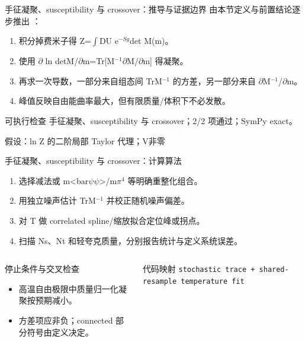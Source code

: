 \begin{frame}[t]{手征凝聚、susceptibility 与 crossover：推导与证据边界}
\footnotesize
{}\quad 由本节定义与前置结论逐步推出 ：
\begin{enumerate}
\item 积分掉费米子得 Z=\ensuremath{\int}DU e\ensuremath{^{-Sg}}det M(m)。
\item 使用 \ensuremath{\partial} ln detM/\allowbreak{}\ensuremath{\partial}m=Tr[M\ensuremath{^{-1}}\ensuremath{\partial}M/\allowbreak{}\ensuremath{\partial}m] 得凝聚。
\item 再求一次导数，一部分来自组态间 TrM\ensuremath{^{-1}} 的方差，另一部分来自 \ensuremath{\partial}M\ensuremath{^{-1}}/\allowbreak{}\ensuremath{\partial}m。
\item 峰值反映自由能曲率最大，但有限质量/\allowbreak{}体积下不必发散。
\end{enumerate}\begin{block}{可执行检查}
\quad 手征凝聚、susceptibility 与 crossover；2/2 项通过；SymPy exact。
\par\scriptsize 假设：ln Z 的二阶局部 Taylor 代理；V非零
\end{block}
\end{frame}

\begin{frame}[t]{手征凝聚、susceptibility 与 crossover：计算算法}
\footnotesize
{}\begin{enumerate}
\item 选择减法或 m<bar\ensuremath{\psi}\ensuremath{\psi}>/\allowbreak{}m\ensuremath{\pi}\ensuremath{^{4}} 等明确重整化组合。
\item 用独立噪声估计 TrM\ensuremath{^{-1}} 并校正随机噪声偏差。
\item 对 T 做 correlated spline/\allowbreak{}缩放拟合定位峰或拐点。
\item 扫描 Ns、Nt 和轻夸克质量，分别报告统计与定义系统误差。
\end{enumerate}\begin{columns}[T,onlytextwidth]
\begin{block}{停止条件与交叉检查}\scriptsize\begin{itemize}
\item[\CheckMark] 高温自由极限中质量归一化凝聚按预期减小。
\item[\CheckMark] 方差项应非负；connected 部分符号由定义决定。
\end{itemize}\end{block}
\begin{block}{代码映射}
\scriptsize \texttt{stochastic trace + shared-resample temperature fit}
\end{block}\end{columns}\end{frame}

